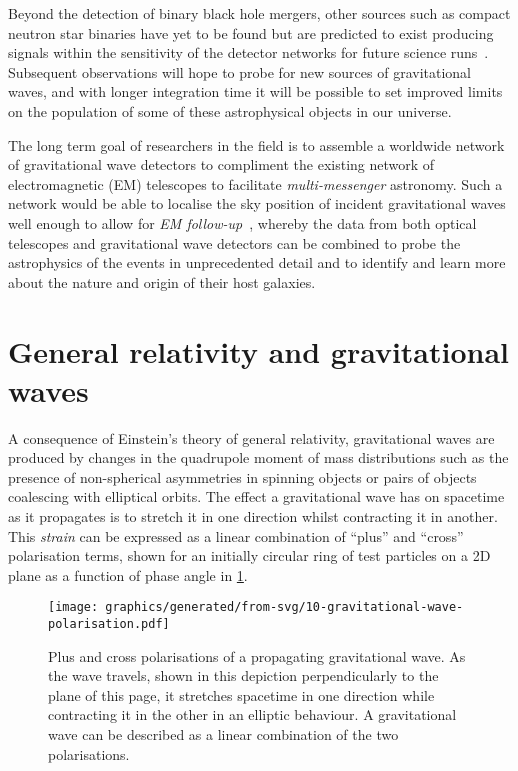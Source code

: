 Beyond the detection of binary black hole mergers, other sources such as compact neutron star binaries have yet to be found but are predicted to exist producing signals within the sensitivity of the detector networks for future science runs~\cite{Abbott2016f}. Subsequent observations will hope to probe for new sources of gravitational waves, and with longer integration time it will be possible to set improved limits on the population of some of these astrophysical objects in our universe.

The long term goal of researchers in the field is to assemble a worldwide network of gravitational wave detectors to compliment the existing network of electromagnetic (\gls{EM}) telescopes to facilitate \emph{multi-messenger} astronomy. Such a network would be able to localise the sky position of incident gravitational waves well enough to allow for \emph{\gls{EM} follow-up}~\cite{Abbott2016e, Abbott2016f}, whereby the data from both optical telescopes and gravitational wave detectors can be combined to probe the astrophysics of the events in unprecedented detail and to identify and learn more about the nature and origin of their host galaxies.

\section{General relativity and gravitational waves}
A consequence of Einstein's theory of general relativity, gravitational waves are produced by changes in the quadrupole moment of mass distributions such as the presence of non-spherical asymmetries in spinning objects or pairs of objects coalescing with elliptical orbits. The effect a gravitational wave has on spacetime as it propagates is to stretch it in one direction whilst contracting it in another. This \emph{strain} can be expressed as a linear combination of ``plus'' and ``cross'' polarisation terms, shown for an initially circular ring of test particles on a 2D plane as a function of phase angle in \cref{fig:gravitational-wave-polarisation}.

\begin{figure}
  \centering
  \texttt{[image: graphics/generated/from-svg/10-gravitational-wave-polarisation.pdf]}
  \caption[Plus and cross polarisations of a propagating gravitational wave]{\label{fig:gravitational-wave-polarisation}Plus and cross polarisations of a propagating gravitational wave. As the wave travels, shown in this depiction perpendicularly to the plane of this page, it stretches spacetime in one direction while contracting it in the other in an elliptic behaviour. A gravitational wave can be described as a linear combination of the two polarisations.}
\end{figure}

